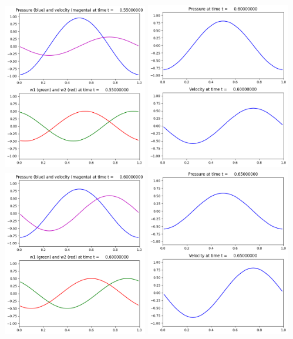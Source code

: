 \documentclass[11pt]{article}
\begin{document}
\includegraphics[width=0.475\textwidth]{frame0011fig2.png}
\vskip 10pt 
\includegraphics[width=0.475\textwidth]{frame0012fig1.png}
\includegraphics[width=0.475\textwidth]{frame0012fig2.png}
\vskip 10pt 
\includegraphics[width=0.475\textwidth]{frame0013fig1.png}
\end{document}
